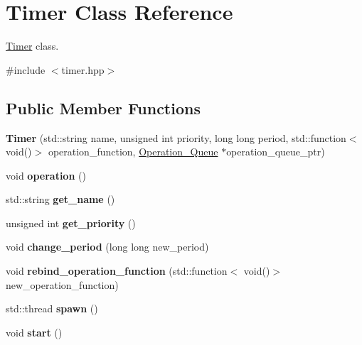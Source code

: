 \hypertarget{classTimer}{}\section{Timer Class Reference}
\label{classTimer}


\hyperlink{classTimer}{Timer} class.  




{\ttfamily \#include $<$timer.\+hpp$>$}

\subsection*{Public Member Functions}
\begin{DoxyCompactItemize}
\item 
{\bfseries Timer} (std\+::string name, unsigned int priority, long long period, std\+::function$<$ void()$>$ operation\+\_\+function, \hyperlink{classOperation__Queue}{Operation\+\_\+\+Queue} $\ast$operation\+\_\+queue\+\_\+ptr)\hypertarget{classTimer_a16df63cd14ab5d1b4239283babd27e30}{}\label{classTimer_a16df63cd14ab5d1b4239283babd27e30}

\item 
void {\bfseries operation} ()\hypertarget{classTimer_a0210f7f3f1ce0999a469a04c0fd202ac}{}\label{classTimer_a0210f7f3f1ce0999a469a04c0fd202ac}

\item 
std\+::string {\bfseries get\+\_\+name} ()\hypertarget{classTimer_a19255976397d5af980913b314aee1b9c}{}\label{classTimer_a19255976397d5af980913b314aee1b9c}

\item 
unsigned int {\bfseries get\+\_\+priority} ()\hypertarget{classTimer_ae10e24cb90e19951244503465738e745}{}\label{classTimer_ae10e24cb90e19951244503465738e745}

\item 
void {\bfseries change\+\_\+period} (long long new\+\_\+period)\hypertarget{classTimer_a871ff84116553c144bb3416743125fb8}{}\label{classTimer_a871ff84116553c144bb3416743125fb8}

\item 
void {\bfseries rebind\+\_\+operation\+\_\+function} (std\+::function$<$ void()$>$ new\+\_\+operation\+\_\+function)\hypertarget{classTimer_ad6efdb8f9a9be1d0bd2ca3786f5d1166}{}\label{classTimer_ad6efdb8f9a9be1d0bd2ca3786f5d1166}

\item 
std\+::thread {\bfseries spawn} ()\hypertarget{classTimer_a6d7dc6419b2eac8dec4997097ec5a2dd}{}\label{classTimer_a6d7dc6419b2eac8dec4997097ec5a2dd}

\item 
void {\bfseries start} ()\hypertarget{classTimer_a3a8b5272198d029779dc9302a54305a8}{}\label{classTimer_a3a8b5272198d029779dc9302a54305a8}

\end{DoxyCompactItemize}


